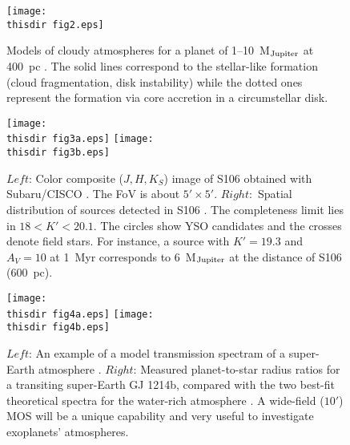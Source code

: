 \begin{figure}
\centerline{
\texttt{[image: \\thisdir fig2.eps]}
}
\caption{Models of cloudy atmospheres for a planet of 1--10~M$_{\rm
 Jupiter}$ at 400~pc \citep{spi12}. The solid lines correspond to the
 stellar-like formation (cloud fragmentation, disk instability) while
 the dotted ones represent the formation via core accretion in a
 circumstellar disk.}
\label{fig:models}
\end{figure}

\begin{figure}
\centerline{
\texttt{[image: \\thisdir fig3a.eps]}
\hspace{5mm}
\texttt{[image: \\thisdir fig3b.eps]}
}
\caption{$Left$: Color composite ($J, H, K_S$) image of S106 obtained
 with Subaru/CISCO \citep{oas06}. The FoV is about $5' \times
 5'$. $Right:$ Spatial distribution of sources detected in S106
 \citep{oas06}. The completeness limit lies in $18 < K' < 20.1$. The
 circles show YSO candidates and the crosses denote field stars. For
 instance, a source with $K'=19.3$ and $A_V=10$ at 1~Myr corresponds to
 6~M$_{\rm Jupiter}$ at the distance of S106 (600~pc).}
\label{fig:spatial_dist}
\end{figure}

\begin{figure}
\centerline{
\texttt{[image: \\thisdir fig4a.eps]}
\hspace{10mm}
\texttt{[image: \\thisdir fig4b.eps]}
}
\caption{$Left$: An example of a model transmission spectram of a
 super-Earth atmosphere \citep{ben12}. $Right$: Measured planet-to-star
 radius ratios for a transiting super-Earth GJ 1214b, compared with the
 two best-fit theoretical spectra for the water-rich atmosphere
 \citep{nar13}. A wide-field ($10'$) MOS will be a unique capability and
 very useful to investigate exoplanets' atmospheres.}
\label{fig:trans_spec}
\end{figure}




%

